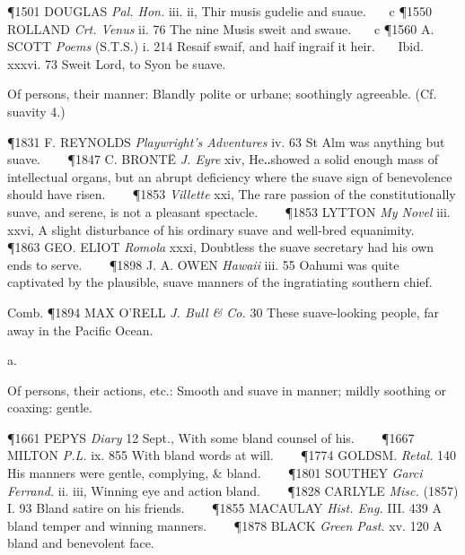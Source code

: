 \begin{description}[wide, labelwidth=!, labelindent=0pt]
\begin{myenumerate}
\P 1501 DOUGLAS  \textit{Pal. Hon.} iii. ii, Thir musis gudelie and suaue.    c 
\P 1550 ROLLAND  \textit{Crt. Venus} ii. 76 The nine Musis sweit and swaue.    c 
\P 1560 A. SCOTT  \textit{Poems} (S.T.S.) i. 214 Resaif swaif, and haif ingraif it heir.    Ibid. xxxvi. 73 Sweit Lord, to Syon be suave.

 Of persons, their manner: Blandly polite or urbane; soothingly agreeable. (Cf. suavity 4.)

\P 1831 F. REYNOLDS  \textit{Playwright's Adventures} iv. 63 St Alm was anything but suave.    
\P 1847 C. BRONTË  \textit{J. Eyre} xiv, He‥showed a solid enough mass of intellectual organs, but an abrupt deficiency where the suave sign of benevolence should have risen.    
\P 1853    \textit{Villette} xxi, The rare passion of the constitutionally suave, and serene, is not a pleasant spectacle.    
\P 1853 LYTTON  \textit{My Novel} iii. xxvi, A slight disturbance of his ordinary suave and well-bred equanimity.    
\P 1863 GEO. ELIOT  \textit{Romola} xxxi, Doubtless the suave secretary had his own ends to serve.    
\P 1898 J. A. OWEN  \textit{Hawaii} iii. 55 Oahumi was quite captivated by the plausible, suave manners of the ingratiating southern chief.

Comb. \P 1894 MAX O'RELL \textit{J. Bull \& Co.} 30 These suave-looking people, far away in the Pacific Ocean.
\end{myenumerate}


 a.

\noindent {}

\vspace{-0.3cm}

\begin{myenumerate}

 Of persons, their actions, etc.: Smooth and suave in manner; mildly soothing or coaxing: gentle.

\P 1661 PEPYS  \textit{Diary} 12 Sept., With some bland counsel of his.    
\P 1667 MILTON  \textit{P.L.} ix. 855 With bland words at will.    
\P 1774 GOLDSM.  \textit{Retal.} 140 His manners were gentle, complying, \& bland.    
\P 1801 SOUTHEY  \textit{Garci Ferrand.} ii. iii, Winning eye and action bland.    
\P 1828 CARLYLE  \textit{Misc.} (1857) I. 93 Bland satire on his friends.    
\P 1855 MACAULAY  \textit{Hist. Eng.} III. 439 A bland temper and winning manners.    
\P 1878 BLACK  \textit{Green Past.} xv. 120 A bland and benevolent face.


\end{myenumerate}
\end{description}
